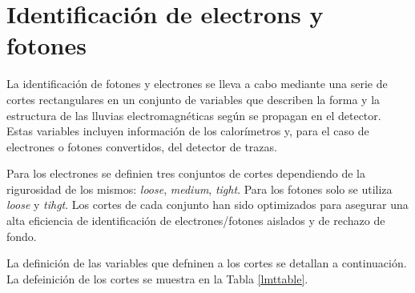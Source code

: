 \section{Identificación de electrons y fotones}

La identificación de fotones y electrones se lleva a cabo mediante una serie de cortes rectangulares en un conjunto de variables que describen la forma y la estructura de las lluvias electromagnéticas según se propagan en el detector. Estas variables incluyen información de los calorímetros y, para el caso de electrones o fotones convertidos, del detector de trazas.

Para los electrones se definien tres conjuntos de cortes dependiendo de la rigurosidad de los mismos: \textit{loose}, \textit{medium}, \textit{tight}. Para los fotones solo se utiliza \textit{loose} y \textit{tihgt}. Los cortes de cada conjunto han sido optimizados para asegurar una alta eficiencia de identificación de electrones/fotones aislados y de rechazo de fondo.

La definición de las variables que defninen a los cortes se detallan a continuación. La defeinición de los cortes se muestra en la Tabla \ref{lmttable}.


